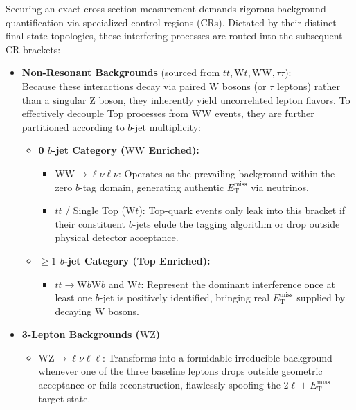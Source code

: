 Securing an exact cross-section measurement demands rigorous background quantification via specialized control regions (CRs). Dictated by their distinct final-state topologies, these interfering processes are routed into the subsequent CR brackets:

\begin{itemize}
    \item \textbf{Non-Resonant Backgrounds} (sourced from $t\bar{t}, \text{W}t, \text{WW}, \tau\tau$):\\
    Because these interactions decay via paired $\text{W}$ bosons (or $\tau$ leptons) rather than a singular $\text{Z}$ boson, they inherently yield uncorrelated lepton flavors. To effectively decouple Top processes from $\text{WW}$ events, they are further partitioned according to $b$-jet multiplicity:
    \begin{itemize}
        \item \textbf{0 $b$-jet Category ($\text{WW}$ Enriched):}
        \begin{itemize}
            \item $\text{WW} \to \ell\nu\ell\nu$: Operates as the prevailing background within the zero $b$-tag domain, generating authentic $E_{\text{T}}^{\text{miss}}$ via neutrinos.
            \item $t\bar{t}$ / Single Top ($\text{W}t$): Top-quark events only leak into this bracket if their constituent $b$-jets elude the tagging algorithm or drop outside physical detector acceptance.
        \end{itemize}
        \item \textbf{$\ge 1$ $b$-jet Category (Top Enriched):}
        \begin{itemize}
             \item $t\bar{t} \to \text{W}b\text{W}b$ and $\text{W}t$: Represent the dominant interference once at least one $b$-jet is positively identified, bringing real $E_{\text{T}}^{\text{miss}}$ supplied by decaying $\text{W}$ bosons.
        \end{itemize}
    \end{itemize}

    \item \textbf{3-Lepton Backgrounds ($\text{WZ}$)}
    \begin{itemize}
        \item $\text{WZ} \to \ell\nu\ell\ell$: Transforms into a formidable irreducible background whenever one of the three baseline leptons drops outside geometric acceptance or fails reconstruction, flawlessly spoofing the $2\ell + E_{\text{T}}^{\text{miss}}$ target state.
    \end{itemize}
    

\end{itemize}
